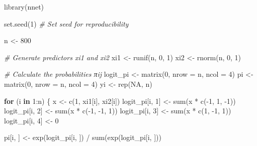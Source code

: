 \documentclass[
]{article}
\newenvironment{Shaded}{\begin{snugshade}}{\end{snugshade}}
\newcommand{\AttributeTok}[1]{\textcolor[rgb]{0.77,0.63,0.00}{#1}}
\newcommand{\CommentTok}[1]{\textcolor[rgb]{0.56,0.35,0.01}{\textit{#1}}}
\newcommand{\ConstantTok}[1]{\textcolor[rgb]{0.00,0.00,0.00}{#1}}
\newcommand{\ControlFlowTok}[1]{\textcolor[rgb]{0.13,0.29,0.53}{\textbf{#1}}}
\newcommand{\DecValTok}[1]{\textcolor[rgb]{0.00,0.00,0.81}{#1}}
\newcommand{\FunctionTok}[1]{\textcolor[rgb]{0.00,0.00,0.00}{#1}}
\newcommand{\NormalTok}[1]{#1}
\newcommand{\OtherTok}[1]{\textcolor[rgb]{0.56,0.35,0.01}{#1}}
\newcommand{\SpecialCharTok}[1]{\textcolor[rgb]{0.00,0.00,0.00}{#1}}
\begin{document}
\begin{Shaded}
\begin{Highlighting}[]
\FunctionTok{library}\NormalTok{(nnet)}

\FunctionTok{set.seed}\NormalTok{(}\DecValTok{1}\NormalTok{)  }\CommentTok{\# Set seed for reproducibility}

\NormalTok{n }\OtherTok{\textless{}{-}} \DecValTok{800}

\CommentTok{\# Generate predictors xi1 and xi2}
\NormalTok{xi1 }\OtherTok{\textless{}{-}} \FunctionTok{runif}\NormalTok{(n, }\DecValTok{0}\NormalTok{, }\DecValTok{1}\NormalTok{)}
\NormalTok{xi2 }\OtherTok{\textless{}{-}} \FunctionTok{rnorm}\NormalTok{(n, }\DecValTok{0}\NormalTok{, }\DecValTok{1}\NormalTok{)}

\CommentTok{\# Calculate the probabilities πij}
\NormalTok{logit\_pi }\OtherTok{\textless{}{-}} \FunctionTok{matrix}\NormalTok{(}\DecValTok{0}\NormalTok{, }\AttributeTok{nrow =}\NormalTok{ n, }\AttributeTok{ncol =} \DecValTok{4}\NormalTok{)}
\NormalTok{pi }\OtherTok{\textless{}{-}} \FunctionTok{matrix}\NormalTok{(}\DecValTok{0}\NormalTok{, }\AttributeTok{nrow =}\NormalTok{ n, }\AttributeTok{ncol =} \DecValTok{4}\NormalTok{)}
\NormalTok{yi }\OtherTok{\textless{}{-}} \FunctionTok{rep}\NormalTok{(}\ConstantTok{NA}\NormalTok{, n)}

\ControlFlowTok{for}\NormalTok{ (i }\ControlFlowTok{in} \DecValTok{1}\SpecialCharTok{:}\NormalTok{n) \{}
\NormalTok{  x }\OtherTok{\textless{}{-}} \FunctionTok{c}\NormalTok{(}\DecValTok{1}\NormalTok{, xi1[i], xi2[i])}
\NormalTok{  logit\_pi[i, }\DecValTok{1}\NormalTok{] }\OtherTok{\textless{}{-}} \FunctionTok{sum}\NormalTok{(x }\SpecialCharTok{*} \FunctionTok{c}\NormalTok{(}\SpecialCharTok{{-}}\DecValTok{1}\NormalTok{, }\DecValTok{1}\NormalTok{, }\SpecialCharTok{{-}}\DecValTok{1}\NormalTok{))}
\NormalTok{  logit\_pi[i, }\DecValTok{2}\NormalTok{] }\OtherTok{\textless{}{-}} \FunctionTok{sum}\NormalTok{(x }\SpecialCharTok{*} \FunctionTok{c}\NormalTok{(}\SpecialCharTok{{-}}\DecValTok{1}\NormalTok{, }\SpecialCharTok{{-}}\DecValTok{1}\NormalTok{, }\DecValTok{1}\NormalTok{))}
\NormalTok{  logit\_pi[i, }\DecValTok{3}\NormalTok{] }\OtherTok{\textless{}{-}} \FunctionTok{sum}\NormalTok{(x }\SpecialCharTok{*} \FunctionTok{c}\NormalTok{(}\DecValTok{1}\NormalTok{, }\SpecialCharTok{{-}}\DecValTok{1}\NormalTok{, }\DecValTok{1}\NormalTok{))}
\NormalTok{  logit\_pi[i, }\DecValTok{4}\NormalTok{] }\OtherTok{\textless{}{-}} \DecValTok{0}
  
\NormalTok{  pi[i, ] }\OtherTok{\textless{}{-}} \FunctionTok{exp}\NormalTok{(logit\_pi[i, ]) }\SpecialCharTok{/} \FunctionTok{sum}\NormalTok{(}\FunctionTok{exp}\NormalTok{(logit\_pi[i, ]))}
  

\end{Highlighting}
\end{Shaded}
\end{document}
